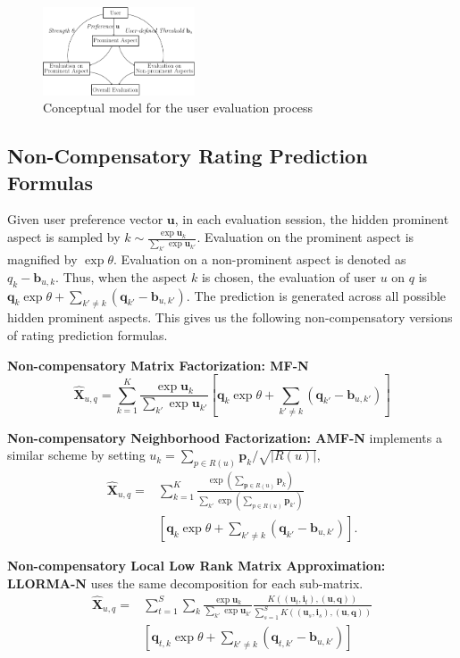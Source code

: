 \documentclass[letterpaper]{article} %
\newcommand{\Rating}{\mathbf{X}}
\begin{document}
\begin{figure}[htbp]
\centering
\includegraphics[width=0.4\textwidth]{conceptualmodel.pdf}
\caption{Conceptual model for the user evaluation process}
\label{fig:model}
\end{figure}


\subsection{Non-Compensatory Rating Prediction Formulas}
Given user preference vector $\mathbf{u}$, in each evaluation session, the hidden prominent aspect is sampled by $k\sim \frac{\exp \mathbf{u}_k}{\sum_{k'} \exp \mathbf{u}_{k'}} $. Evaluation on the prominent aspect is magnified by  $\exp \theta$. Evaluation on a non-prominent aspect is denoted as $q_k-\mathbf{b}_{u,k}$. Thus, when the aspect $k$ is chosen, the evaluation of user $u$ on $q$ is $\mathbf{q}_k \exp\theta  + \sum_{k'\neq k} (\mathbf{q}_{k'}-\mathbf{b}_{u,k'})$. The prediction is generated across all possible hidden prominent aspects. This gives us the following non-compensatory versions of rating prediction formulas.

\textbf{Non-compensatory Matrix Factorization: MF-N} 
\begin{equation}\label{equ:MF-N}
 \hat{\mathbf{X}}_{u,q}=\sum_{k=1}^{K} \frac{\exp \mathbf{u}_k}{\sum_{k'} \exp \mathbf{u}_{k'}} [ \mathbf{q}_k  \exp\theta  + \sum_{k'\neq k} (\mathbf{q}_{k'}-\mathbf{b}_{u,k'}) ]
\end{equation}


\textbf{Non-compensatory Neighborhood Factorization: AMF-N} implements a similar scheme by setting $u_k =\sum_{p \in R(u)} \mathbf{p}_k/\sqrt{|R(u)|} $, 
\begin{eqnarray}\label{equ:AMF-N}
 \hat{\mathbf{X}}_{u,q}=&\sum_{k=1}^{K} \frac{\exp (\sum_{\mathbf{p} \in R(u)} \mathbf{p}_k )}{\sum_{k'} \exp  (\sum_{p \in R(u)} \mathbf{p}_{k'} ) } \\\nonumber
& [  \mathbf{q}_k \exp\theta + \sum_{k'\neq k} (\mathbf{q}_{k'}-\mathbf{b}_{u,k'}) ].
\end{eqnarray}

\textbf{Non-compensatory Local Low Rank Matrix Approximation: LLORMA-N} uses the same decomposition for each sub-matrix.  
\begin{eqnarray}\label{equ:LLORMA-N}
\hat{\Rating}_{u,q} = & \sum_{t=1}^{S} \sum_k  \frac{\exp \mathbf{u}_k}{\sum_{k'} \exp \mathbf{u}_{k'}}  \frac{K((\mathbf{u}_t,\mathbf{i}_t),(\mathbf{u},\mathbf{q}))}{\sum_{s=1}^{S} K((\mathbf{u}_s,\mathbf{i}_s),(\mathbf{u},\mathbf{q}))} \\\nonumber
& [ \mathbf{q}_{t,k} \exp\theta  + \sum_{k'\neq k} (\mathbf{q}_{t,k'}-\mathbf{b}_{u,k'}) ]
\end{eqnarray}
\end{document}
